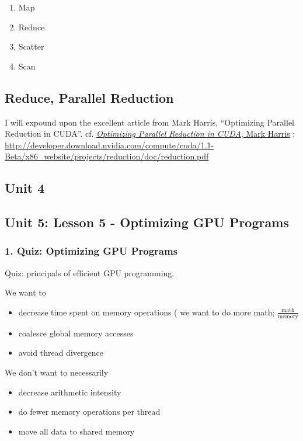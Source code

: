 \documentclass[10pt]{amsart}
\begin{document}
\begin{multicols*}{2}
\begin{enumerate}
\item Map
\item Reduce
\item Scatter
\item Scan
  \end{enumerate}


\subsection{Reduce, Parallel Reduction}

I will expound upon the excellent article from Mark Harris, ``Optimizing Parallel Reduction in CUDA''.  cf. \href{http://developer.download.nvidia.com/compute/cuda/1.1-Beta/x86_website/projects/reduction/doc/reduction.pdf}{\emph{Optimizing Parallel Reduction in CUDA}, Mark Harris} : \url{http://developer.download.nvidia.com/compute/cuda/1.1-Beta/x86_website/projects/reduction/doc/reduction.pdf}


\subsection{Unit 4}

\subsection{Unit 5: Lesson 5 - Optimizing GPU Programs}

\subsubsection{1. Quiz: Optimizing GPU Programs}  

Quiz: principals of efficient GPU programming.  

We want to 
\begin{itemize}
\item decrease time spent on memory operations ( we want to do more math; $\frac{\text{math}}{ \text{memory}}$
\item coalesce global memory accesses
\item avoid thread divergence
\end{itemize}

We don't want to necessarily 
\begin{itemize}
\item decrease arithmetic intensity
\item do fewer memory operations per thread
\item move all data to shared memory 
\end{itemize}  


\end{multicols*}
\end{document}
